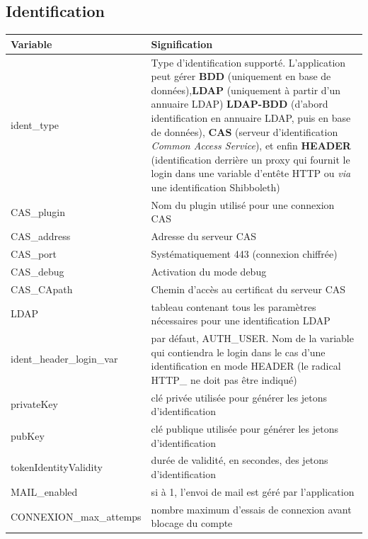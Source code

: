 \subsection{Identification}\label{paramident}
\begin{longtable}{|p{5cm}|p{8cm}|}
\hline
\textbf{Variable} & \textbf{Signification} \\
\hline
\endhead
\hline
\endfoot
\endlastfoot
ident\_type & Type d'identification supporté. L'application peut gérer \textbf{BDD} (uniquement en base de données),\textbf{LDAP} (uniquement à partir d'un annuaire LDAP) \textbf{LDAP-BDD} (d'abord identification en annuaire LDAP, puis en base de données), \textbf{CAS} (serveur d'identification \textit{Common Access Service}), et enfin \textbf{HEADER} (identification derrière un proxy qui fournit le login dans une variable d'entête HTTP ou \textit{via} une identification Shibboleth)\\
CAS\_plugin & Nom du plugin utilisé pour une connexion CAS \\
CAS\_address & Adresse du serveur CAS\\
CAS\_port & Systématiquement 443 (connexion chiffrée)\\
CAS\_debug & Activation du mode debug \\
CAS\_CApath & Chemin d'accès au certificat du serveur CAS \\
LDAP & tableau contenant tous les paramètres nécessaires pour une identification LDAP \\
ident\_header\_login\_var & par défaut, AUTH\_USER. Nom de la variable qui contiendra le login dans le cas d'une identification en mode HEADER (le radical HTTP\_  ne doit pas être indiqué) \\

privateKey & clé privée utilisée pour générer les jetons d'identification \\

pubKey & clé publique utilisée pour générer les jetons d'identification \\

tokenIdentityValidity & durée de validité, en secondes, des jetons d'identification\\

MAIL\_enabled & si à 1, l'envoi de mail est géré par l'application \\

CONNEXION\_max\_attemps & nombre maximum d'essais de connexion avant blocage du compte \\


\end{longtable}
